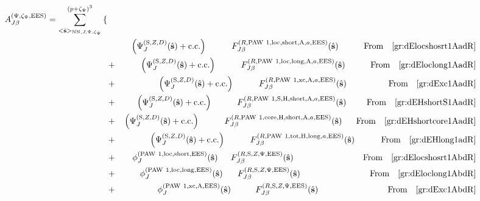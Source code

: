 \documentclass[paper=a4, fontsize=11pt]{article} %
\numberwithin{equation}{section} %
\numberwithin{figure}{section} %
\numberwithin{table}{section} %
\newcommand{\bs}{{\bf{s}}}
\newcommand{\hs}{{\hat{\bf{s}}}}
\newcommand{\rS}{{\mathrm{S}}}
\newcommand{\rEES}{{\mathrm{EES}}}
\newcommand{\rxc}{{\mathrm{xc}}}
\newcommand{\rcore}{{\mathrm{core}}}
\newcommand{\rNN}{{\mathrm{NN}}}
\newcommand{\rshort}{{\mathrm{short}}}
\newcommand{\rcc}{{\mathrm{c.c.}}}
\newcommand{\rlong}{{\mathrm{long}}}
\newcommand{\rP}{{\mathrm{PAW}}}
\newcommand{\rH}{{\mathrm{H}}}
\newcommand{\rA}{{\mathrm{A}}}
\newcommand{\rlo}{{\mathrm{loc}}}
\newcommand{\rtot}{{\mathrm{tot}}}
\newcommand{\pzp}{{(p+\zeta_{\Psi})^3}}
\newcommand{\hsJp}{{<\hs>_{\rNN,J,\Psi,\zeta_\Psi}}}
\newcommand{\fr}{{\nonumber \ \ \ \ \ \mathrm{From}\ \ \ }}
\begin{document}
\begin{eqnarray}
A_{J\beta}^{(\Psi,\zeta_\Psi,\rEES)} = 
 \sum_{\hsJp}^{\pzp} \left\{ \right. &&  \nonumber \\
&&\left. \left(\Psi_J^{(\rS,Z,D)}(\hat \bs)+ \rcc\right)\hspace*{0.4in} F_{J\beta}^{(R,\rP\ 1,\rlo,\rshort,\rA,a,\rEES)}(\hs) \hspace*{0.18in}\fr \eqref{gr:dElocshosrt1AadR} \right. \\
&+& \left. \left(\Psi_J^{(\rS,Z,D)}(\hat \bs)+ \rcc\right) \hspace*{0.4in} F_{J\beta}^{(R,\rP\ 1,\rlo,\rlong,\rA,a,\rEES)}(\hs) \hspace*{0.18in} \fr \eqref{gr:dEloclong1AadR}\right.\\
&+& \left.  \left(\Psi_J^{(\rS,Z,D)}(\hat \bs)+ \rcc \right)\hspace*{0.4in} F_{J\beta}^{(R,\rP\ 1,\rxc,\rA,a,\rEES)}(\hs) \hspace*{0.45in} \fr \eqref{gr:dExc1AadR}\right.\\
&+& \left.  \left(\Psi_J^{(\rS,Z,D)}(\hat \bs)+ \rcc\right)\hspace*{0.4in} F_{J\beta}^{(R,\rP\ 1,\rS,\rH,\rshort,\rA,a,\rEES)}(\hs) \hspace*{0.1in} \fr \eqref{gr:dEHshortS1AadR}\right.\\
&+& \left.  \left(\Psi_J^{(\rS,Z,D)}(\hat \bs)+ \rcc\right) \hspace*{0.4in}F_{J\beta}^{(R,\rP\ 1,\rcore,\rH,\rshort,\rA,a,\rEES)}(\hs) \fr \eqref{gr:dEHshortcore1AadR}\right.\\
&+& \left.  \left(\Psi_J^{(\rS,Z,D)}(\hat \bs)+ \rcc\right) \hspace*{0.4in}F_{J\beta}^{(R,\rP\ 1,\rtot,\rH,\rlong,a,\rEES)}(\hs) \hspace*{0.2in} \fr \eqref{gr:dEHlong1adR}\right.\\
&+& \left.\phi_J^{(\rP\ 1,\rlo,\rshort,\rEES)}(\hs) \hspace*{0.21in}F_{J\beta}^{(R,\rS,Z,\Psi,\rEES)}(\hs) \hspace*{0.9in}\fr \eqref{gr:dElocshosrt1AbdR}\right.\\
&+& \left.\phi_J^{(\rP\ 1,\rlo,\rlong,\rEES)}(\hs) \hspace*{0.24in}F_{J\beta}^{(R,\rS,Z,\Psi,\rEES)}(\hs) \hspace*{0.9in}\fr \eqref{gr:dEloclong1AbdR}\right.\\
&+& \left.  \phi_J^{(\rP\ 1,\rxc,\rA,\rEES)}(\hs)\hspace*{0.4in}F_{J\beta}^{(R,\rS,Z,\Psi,\rEES)}(\hs) \hspace*{0.9in}\fr \eqref{gr:dExc1AbdR}\right.\\

\end{eqnarray}
\end{document}

